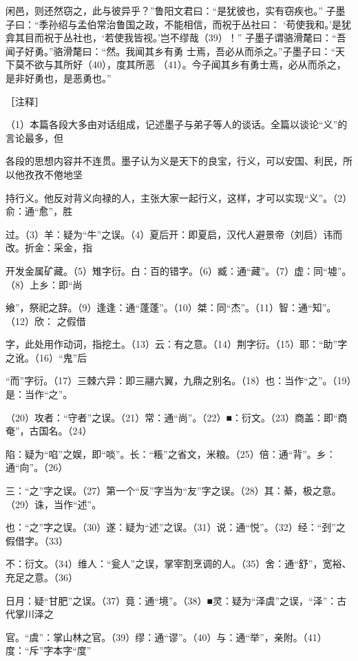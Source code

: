\documentclass[12pt,UTF8]{ctexbook}
\begin{document}
闲邑，则还然窃之，此与彼异乎？”鲁阳文君曰：“是犹彼也，实有窃疾也。” 
子墨子曰：“季孙绍与孟伯常治鲁国之政，不能相信，而祝于丛社曰： 
‘苟使我和。’是犹弇其目而祝于丛社也，‘若使我皆视。’岂不缪哉（39）！” 
子墨子谓骆滑氂曰：“吾闻子好勇。”骆滑氂曰：“然。我闻其乡有勇 
士焉，吾必从而杀之。”子墨子曰：“天下莫不欲与其所好（40），度其所恶 
（41）。今子闻其乡有勇士焉，必从而杀之，是非好勇也，是恶勇也。” 


［注释］ 

（1）本篇各段大多由对话组成，记述墨子与弟子等人的谈话。全篇以谈论“义”的言论最多，但 

各段的思想内容并不连贯。墨子认为义是天下的良宝，行义，可以安国、利民，所以他孜孜不倦地坚 

持行义。他反对背义向禄的人，主张大家一起行义，这样，才可以实现“义”。（2）俞：通“愈”，胜 

过。（3）羊：疑为“牛”之误。（4）夏后开：即夏启，汉代人避景帝（刘启）讳而改。折金：采金，指 

开发金属矿藏。（5）雉字衍。白：百的错字。（6）臧：通“藏”。（7）虚：同“墟”。（8）上乡：即“尚 

飨”，祭祀之辞。（9）逢逢：通“蓬蓬”。（10）桀：同“杰”。（11）智：通“知”。（12）欣： 之假借 

字，此处用作动词，指挖土。（13）云：有之意。（14）荆字衍。（15）耶：“助”字之讹。（16）“鬼”后 

“而”字衍。（17）三棘六异：即三翮六翼，九鼎之别名。（18）也：当作“之”。（19）是：当作“之”。 

（20）攻者：“守者”之误。（21）常：通“尚”。（22）■：衍文。（23）商盖：即“商奄”，古国名。（24） 

陷：疑为“啗”之娱，即“啖”。长：“粻”之省文，米粮。（25）倍：通“背”。乡：通“向”。（26） 

三：“之”字之误。（27）第一个“反”字当为“友”字之误。（28）其：綦，极之意。（29）诛，当作“述”。 

也：“之”字之误。（30）遂：疑为“述”之误。（31）说：通“悦”。（32）经：“刭”之假借字。（33） 

不：衍文。（34）维人：“瓮人”之误，掌宰割烹调的人。（35）舍：通“舒”，宽裕、充足之意。（36） 

日月：疑“甘肥”之误。（37）竟：通“境”。（38）■灵：疑为“泽虞”之误，“泽”：古代掌川泽之 

官。“虞”：掌山林之官。（39）缪：通“谬”。（40）与：通“举”，亲附。（41）度：“斥”字本字“度” 
\end{document}
